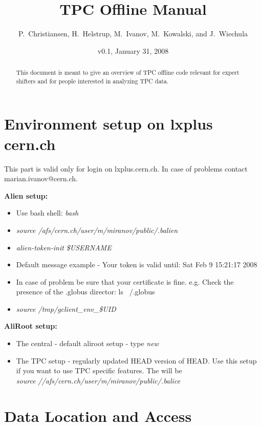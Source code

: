 \documentclass[a4paper,12pt]{article}
\begin{document}
  \title{TPC Offline Manual}
  \author{P.~Christiansen, H.~Helstrup, M.~Ivanov, M.~Kowalski, 
    and J.~Wiechula} 
  \date{v0.1, January 31, 2008} 
\maketitle
\begin{abstract}
  This document is meant to give an overview of TPC offline code
  relevant for expert shifters and for people interested in analyzing
  TPC data.
\end{abstract}

\tableofcontents

\newpage 



\section{Environment setup on lxplus cern.ch}

This part is valid only for login on lxplus.cern.ch. In case of problems contact marian.ivanov@cern.ch.


{\bf{Alien setup:}}
\begin{itemize}
\item Use bash shell: {\it bash}
\item {\it{source /afs/cern.ch/user/m/miranov/public/.balien}}
\item {\it alien-token-init \$USERNAME}
\item Default message example -  Your token is valid until: Sat Feb  9 15:21:17 2008
\item In case of problem be sure that your certificate is fine.
      e.g. Check the presence of the .globus director: 	ls ~/.globus 
\item {\it source /tmp/gclient\_env\_\$UID}
\end{itemize}

{\bf{AliRoot setup:}}
\begin{itemize}
\item The central - default aliroot setup - type {\it new}
\item The TPC setup -  regularly updated HEAD version of HEAD. Use this setup if you want to use TPC specific features. The will be  \\
      {\it source //afs/cern.ch/user/m/miranov/public/.balice}
\end{itemize} 




\section{Data Location and Access}
\end{document}
